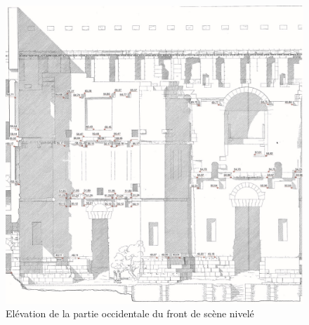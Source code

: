 \begin{figure}[!h]
	\includegraphics[width=\linewidth]{images/frontdescene}
	\caption[Elévation du front de scène]{Elévation de la partie occidentale du front de scène nivelé \cite[Pl. XXIX]{orangePl}}
	\label{frontdescene} 
\end{figure} 
	
